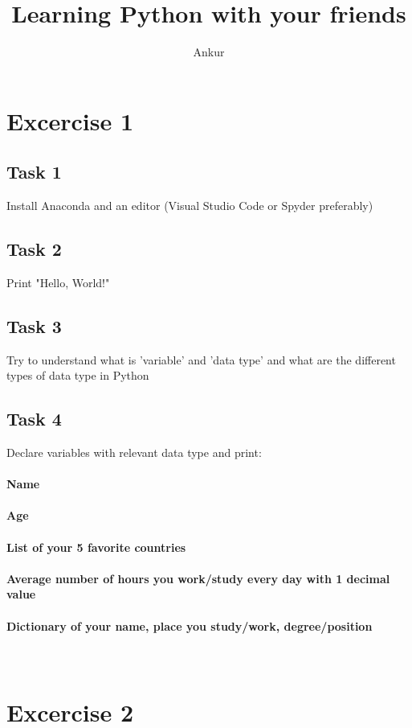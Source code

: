 \documentclass{article}
\title{Learning Python with your friends}
\author{Ankur}
\begin{document}
    \maketitle{}
    \section*{Excercise 1}
    \subsection*{Task 1}
    Install Anaconda and an editor (Visual Studio Code or Spyder preferably)
    \subsection*{Task 2}
    Print "Hello, World!"
    \subsection*{Task 3}
    Try to understand what is 'variable' and 'data type' and what are the different types of data type in Python
    \subsection*{Task 4}
    Declare variables with relevant data type and print:
    \paragraph{Name}
    \paragraph{Age}
    \paragraph{List of your 5 favorite countries}
    \paragraph{Average number of hours you work/study every day with 1 decimal value}
    \paragraph{Dictionary of your name, place you study/work, degree/position}
    \\
    \section*{Excercise 2}
\end{document}
